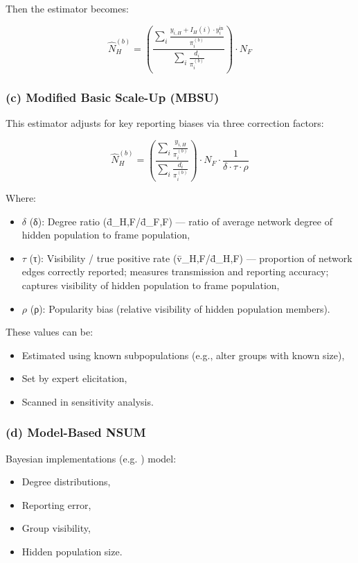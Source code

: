 \documentclass[
  12pt,
  letterpaper,
  DIV=11,
  numbers=noendperiod]{scrartcl}
\theoremstyle{plain}
\theoremstyle{definition}
\begin{document}
Then the estimator becomes:

\[\hat{N}_H^{(b)} = \left( \frac{\sum_{i} \frac{y_{i,H} + I_H(i) \cdot y_{i}^{\text{in}}}{\pi_i^{(b)}}}{\sum_{i} \frac{d_i}{\pi_i^{(b)}}} \right) \cdot N_F\]

\subsubsection{(c) Modified Basic Scale-Up
(MBSU)}\label{c-modified-basic-scale-up-mbsu}

This estimator adjusts for key reporting biases via three correction
factors:

\[\hat{N}_H^{(b)} = \left( \frac{\sum_{i} \frac{y_{i,H}}{\pi_i^{(b)}}}{\sum_{i} \frac{d_i}{\pi_i^{(b)}}} \right) \cdot N_F \cdot \frac{1}{\delta \cdot \tau \cdot \rho}\]

Where:

\begin{itemize}
\item
  \(\delta\) (δ): Degree ratio (d̄\_H,F/d̄\_F,F) --- ratio of average
  network degree of hidden population to frame population,
\item
  \(\tau\) (τ): Visibility / true positive rate (v̄\_H,F/d̄\_H,F) ---
  proportion of network edges correctly reported; measures transmission
  and reporting accuracy; captures visibility of hidden population to
  frame population,
\item
  \(\rho\) (ρ): Popularity bias (relative visibility of hidden
  population members).
\end{itemize}

These values can be:

\begin{itemize}
\item
  Estimated using known subpopulations (e.g., alter groups with known
  size),
\item
  Set by expert elicitation,
\item
  Scanned in sensitivity analysis.
\end{itemize}

\subsubsection{(d) Model-Based NSUM}\label{d-model-based-nsum}

Bayesian implementations (e.g. \textcite{malt15-estimating}) model:

\begin{itemize}
\item
  Degree distributions,
\item
  Reporting error,
\item
  Group visibility,
\item
  Hidden population size.
\end{itemize}
\end{document}
